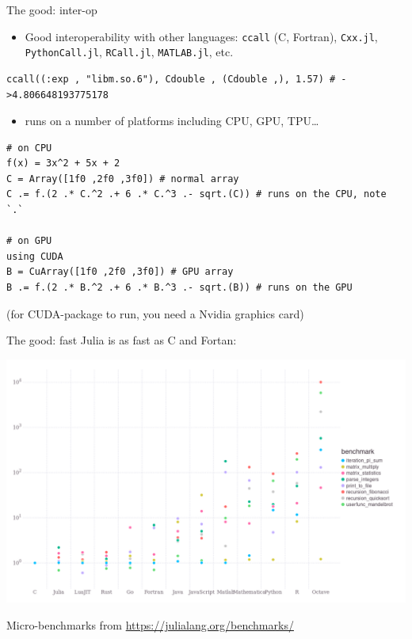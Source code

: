 \documentclass[compress,presentation,aspectratio=169]{beamer}
\begin{document}
\begin{frame}[fragile,label={sec:orgbd9378c}]{The good: inter-op}
  \footnotesize
 \begin{itemize}
\item Good interoperability with other languages: \texttt{ccall} (C, Fortran),
\texttt{Cxx.jl}, \texttt{PythonCall.jl}, \texttt{RCall.jl}, \texttt{MATLAB.jl}, etc.
\end{itemize}

\begin{verbatim}
ccall((:exp , "libm.so.6"), Cdouble , (Cdouble ,), 1.57) # ->4.806648193775178
\end{verbatim}
\pause

\begin{itemize}
\item runs on a number of platforms including CPU, GPU, TPU\ldots{}
\end{itemize}

\begin{verbatim}
# on CPU
f(x) = 3x^2 + 5x + 2
C = Array([1f0 ,2f0 ,3f0]) # normal array
C .= f.(2 .* C.^2 .+ 6 .* C.^3 .- sqrt.(C)) # runs on the CPU, note `.`

# on GPU
using CUDA
B = CuArray([1f0 ,2f0 ,3f0]) # GPU array
B .= f.(2 .* B.^2 .+ 6 .* B.^3 .- sqrt.(B)) # runs on the GPU
\end{verbatim}
(for CUDA-package to run, you need a Nvidia graphics card)
\end{frame}

\begin{frame}[label={sec:orgd62e75c}]{The good: fast}
  \footnotesize
Julia is as fast as C and Fortan:

\begin{center}
\includegraphics[width=.8\linewidth]{./figs/bench.png}
\end{center}
Micro-benchmarks from \url{https://julialang.org/benchmarks/}
\end{frame}
\end{document}
